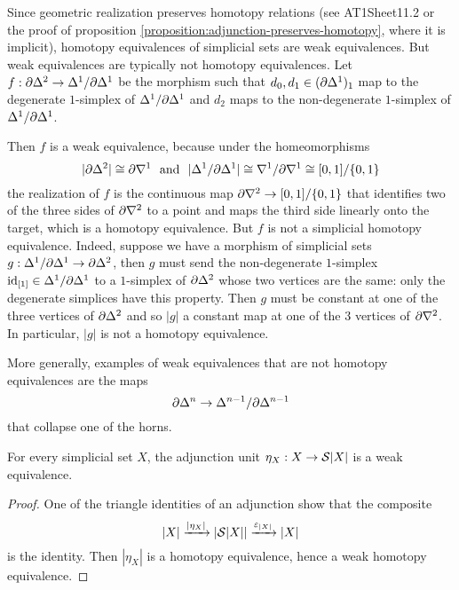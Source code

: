 \begin{examples}
Since geometric realization preserves homotopy relations (see AT1Sheet11.2 or the proof of proposition \ref{proposition:adjunction-preserves-homotopy}, where it is implicit), homotopy equivalences of simplicial sets are weak equivalences. But weak equivalences are typically not homotopy equivalences.
Let $f:\de\Delta^2\to\Delta^1/\de\Delta^1$
be the morphism such that $d_0,d_1\in(\de\Delta^1)_1$ map to the degenerate $1$-simplex of $\Delta^1/\de\Delta^1$ and $d_2$ maps to the non-degenerate $1$-simplex of $\Delta^1/\de\Delta^1$.\alvaropls

Then $f$ is a weak equivalence, because under the homeomorphisms
\[|\de\Delta^2|\cong\de\sx{1}\ \text{ and }\ |\Delta^1/\de\Delta^1|\cong\sx{1}/\de\sx{1}\cong[0,1]/\cb{0,1}\]
the realization of $f$ is the continuous map $\de\sx{2}\to[0,1]/\cb{0,1}$ that identifies two of the three sides of $\de\sx{2}$ to a point and maps the third side linearly onto the target, which is a homotopy equivalence. But $f$ is not a simplicial homotopy equivalence. Indeed, suppose we have a morphism of simplicial sets $g:\Delta^1/\de\Delta^1\to\de\Delta^2$, then $g$ must send the non-degenerate $1$-simplex $\id_{[1]}\in\Delta^1/\de\Delta^1$ to a $1$-simplex of $\de\Delta^2$ whose two vertices are the same: only the degenerate simplices have this property. Then $g$ must be constant at one of the three vertices of $\de\Delta^2$ and so $|g|$ a constant map at one of the $3$ vertices of $\de\sx{2}$. In particular, $|g|$ is not a homotopy equivalence.

More generally, examples of weak equivalences that are not homotopy equivalences are the maps
\[\de\Delta^n\to\Delta^{n-1}/\de\Delta^{n-1}\]
that collapse one of the horns.
\end{examples}

\begin{proposition}\label{proposition:adjunction-unit-is-a-weak-equivalence}
For every simplicial set $X$, the adjunction unit $\eta_X:X\to\S|X|$ is a weak equivalence.
\end{proposition}

\begin{proof}
One of the triangle identities of an adjunction show that the composite
\[|X|\xto{|\eta_X|}|\S|X||\xto{\epsilon_{|X|}}|X|\]
is the identity. Then $|\eta_X|$ is a homotopy equivalence, hence a weak homotopy equivalence.
\end{proof}

